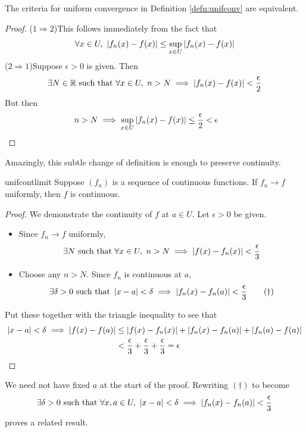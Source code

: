 \goodbreak


\begin{thm}{}{}
	The criteria for uniform convergence in Definition \ref{defn:unifconv} are equivalent.
\end{thm}

\begin{proof}
	($1\Rightarrow 2$)\quad This follows immediately from the fact that
	\[
		\forall x\in U,\ \left| f_n(x)-f(x)\right|\le\sup_{x\in U}\left| f_n(x)-f(x)\right|
	\]
	($2\Rightarrow 1$)\quad Suppose $\epsilon>0$ is given. Then
	\[
		\exists N\in\mathbb{R}\text{ such that }\forall x\in U,\ n>N\implies\left| f_n(x)-f(x)\right|<\frac\epsilon 2
	\]
	But then
	\[
		n>N\implies\sup_{x\in U}\left| f_n(x)-f(x)\right|\le\frac\epsilon 2<\epsilon\tag*{\qedhere}
	\]
\end{proof}


Amazingly, this subtle change of definition is enough to preserve continuity.

\begin{thm}{}{unifcontlimit}
	Suppose $(f_n)$ is a sequence of continuous functions. If $f_n\to f$ uniformly, then $f$ is continuous.
\end{thm}

\begin{proof}
	We demonstrate the continuity of $f$ at $a\in U$. Let $\epsilon>0$ be given.
	\begin{itemize}
	  \item Since $f_n\to f$ uniformly,
		\[
			\exists N\text{ such that }\forall x\in U,\ n>N
			\implies\left| f(x)-f_n(x)\right|<\frac\epsilon 3
		\]
		\item Choose any $n>N$. Since $f_n$ is continuous at $a$,
		\[
			\exists \delta>0\text{ such that }
			\left| x-a\right|<\delta\implies\left| f_n(x)-f_n(a)\right|
			<\frac\epsilon 3\tag{$\dag$}
		\]
	\end{itemize}
	Put these together with the triangle inequality to see that
	\begin{align*}
		\left| x-a\right|<\delta\implies\left| f(x)-f(a)\right|&\le\left| f(x)-f_n(x)\right|+\left| f_n(x)-f_n(a)\right|+\left| f_n(a)-f(a)\right|\\
		&<\frac\epsilon 3+\frac\epsilon 3+\frac\epsilon 3=\epsilon \tag*{\qedhere}
	\end{align*}
\end{proof}

We need not have fixed $a$ at the start of the proof. Rewriting $(\dag)$ to become
\[\exists\delta>0\text{ such that }\forall x,a\in U,\ \nm{x-a}<\delta\implies\nm{f_n(x)-f_n(a)}<\frac\epsilon 3\]
proves a related result.

